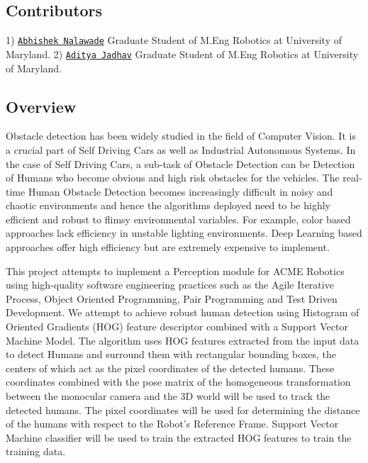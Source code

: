 \href{https://app.travis-ci.com/Abhishek-Nalawade/Human_Obstacle_Detector}{\tt } \href{https://coveralls.io/github/Abhishek-Nalawade/Human_Obstacle_Detector?branch=feature_one}{\tt } \subsection*{\href{https://opensource.org/licenses/MIT}{\tt } }

\subsection*{Contributors}

1) \href{https://github.com/abhishek-nalawade}{\tt Abhishek Nalawade} Graduate Student of M.\+Eng Robotics at University of Maryland. 2) \href{https://github.com/iamjadhav}{\tt Aditya Jadhav} Graduate Student of M.\+Eng Robotics at University of Maryland.

\subsection*{Overview}

Obstacle detection has been widely studied in the field of Computer Vision. It is a crucial part of Self Driving Cars as well as Industrial Autonomous Systems. In the case of Self Driving Cars, a sub-\/task of Obstacle Detection can be Detection of Humans who become obvious and high risk obstacles for the vehicles. The real-\/time Human Obstacle Detection becomes increasingly difficult in noisy and chaotic environments and hence the algorithms deployed need to be highly efficient and robust to flimsy environmental variables. For example, color based approaches lack efficiency in unstable lighting environments. Deep Learning based approaches offer high efficiency but are extremely expensive to implement.

This project attempts to implement a Perception module for A\+C\+ME Robotics using high-\/quality software engineering practices such as the Agile Iterative Process, Object Oriented Programming, Pair Programming and Test Driven Development. We attempt to achieve robust human detection using Histogram of Oriented Gradients (H\+OG) feature descriptor combined with a Support Vector Machine Model. The algorithm uses H\+OG features extracted from the input data to detect Humans and surround them with rectangular bounding boxes, the centers of which act as the pixel coordinates of the detected humans. These coordinates combined with the pose matrix of the homogeneous transformation between the monocular camera and the 3D world will be used to track the detected humans. The pixel coordinates will be used for determining the distance of the humans with respect to the Robot’s Reference Frame. Support Vector Machine classifier will be used to train the extracted H\+OG features to train the training data.

